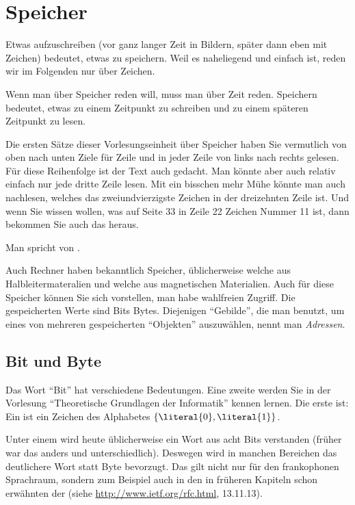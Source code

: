 \Tut\chapter{Speicher}
\label{k:speicher}

Etwas aufzuschreiben (vor ganz langer Zeit in Bildern, später dann
eben mit Zeichen) bedeutet, etwas zu speichern. Weil es naheliegend
und einfach ist, reden wir im Folgenden nur über Zeichen.

Wenn man über Speicher reden will, muss man über Zeit reden. Speichern
bedeutet, etwas zu einem Zeitpunkt zu schreiben und zu einem späteren
Zeitpunkt zu lesen.

Die ersten Sätze dieser Vorlesungseinheit über Speicher haben Sie
vermutlich von oben nach unten Ziele für Zeile und in jeder Zeile von
links nach rechts gelesen.  Für diese Reihenfolge ist der Text auch
gedacht. Man könnte aber auch relativ einfach nur jede dritte Zeile
lesen.  Mit ein bisschen mehr Mühe könnte man auch nachlesen, welches
das zweiundvierzigste Zeichen in der dreizehnten Zeile ist. Und wenn
Sie wissen wollen, was auf Seite 33 in Zeile 22 Zeichen Nummer 11 ist,
dann bekommen Sie auch das heraus.

Man spricht von . 

Auch Rechner haben bekanntlich Speicher, üblicherweise welche aus
Halbleitermateralien und welche aus magnetischen Materialien. Auch für
diese Speicher können Sie sich vorstellen, man habe wahlfreien
Zugriff. Die gespeicherten Werte sind Bits \bzw Bytes. Diejenigen
"`Gebilde"', die man benutzt, um eines von mehreren gespeicherten
"`Objekten"' auszuwählen, nennt man \emph{Adressen}.

\Tut\section{Bit und Byte}

Das Wort "`Bit"' hat verschiedene Bedeutungen. Eine zweite werden Sie
in der Vorlesung "`Theoretische Grundlagen der Informatik"' kennen
lernen. Die erste ist: Ein  ist ein Zeichen
des Alphabetes $\{\literal{0}, \literal{1}\}$.

Unter einem  wird heute üblicherweise ein
Wort aus acht Bits verstanden (früher war das anders und
unterschiedlich). Deswegen wird in manchen Bereichen das deutlichere
Wort  statt Byte bevorzugt. Das gilt nicht
nur für den frankophonen Sprachraum, sondern zum Beispiel auch in den
in früheren Kapiteln schon erwähnten  der
 (siehe
\url{http://www.ietf.org/rfc.html}, 13.11.13).

